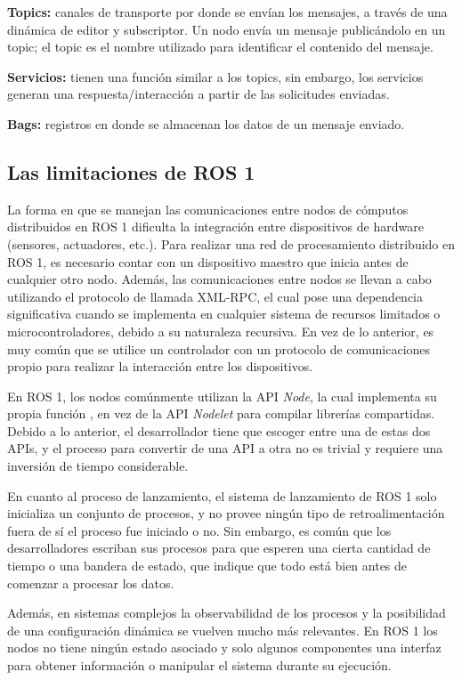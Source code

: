 \textbf{Topics:} canales de transporte por donde se envían los mensajes, a través de una dinámica de editor y subscriptor. Un nodo envía un mensaje publicándolo en un topic; el topic es el nombre utilizado para identificar el contenido del mensaje.

\textbf{Servicios:} tienen una función similar a los topics, sin embargo, los servicios generan una respuesta/interacción a partir de las solicitudes enviadas.

\textbf{Bags:} registros en donde se almacenan los datos de un mensaje enviado.

\subsection{Las limitaciones de ROS 1}

La forma en que se manejan las comunicaciones entre nodos de cómputos distribuidos en ROS 1 dificulta la integración entre dispositivos de hardware (sensores, actuadores, etc.). Para realizar una red de procesamiento distribuido en ROS 1, es necesario contar con un dispositivo maestro que inicia antes de cualquier otro nodo. Además, las comunicaciones entre nodos se llevan a cabo utilizando el protocolo de llamada XML-RPC, el cual pose una dependencia significativa cuando se implementa en cualquier sistema de recursos limitados o microcontroladores, debido a su naturaleza recursiva. En vez de lo anterior, es muy común que se utilice un controlador con un protocolo de comunicaciones propio para realizar la interacción entre los dispositivos.

En ROS 1, los nodos comúnmente utilizan la API \textit{Node}, la cual implementa su propia función , en vez de la API \textit{Nodelet} para compilar librerías compartidas. Debido a lo anterior, el desarrollador tiene que escoger entre una de estas dos APIs, y el proceso para convertir de una API a otra no es trivial y requiere una inversión de tiempo considerable.

En cuanto al proceso de lanzamiento, el sistema de lanzamiento de ROS 1 solo inicializa un conjunto de procesos, y no provee ningún tipo de retroalimentación fuera de sí el proceso fue iniciado o no. Sin embargo, es común que los desarrolladores escriban sus procesos para que esperen una cierta cantidad de tiempo o una bandera de estado, que indique que todo está bien antes de comenzar a procesar los datos. 

Además, en sistemas complejos la observabilidad de los procesos y la posibilidad de una configuración dinámica se vuelven mucho más relevantes. En ROS 1 los nodos no tiene ningún estado asociado y solo algunos componentes una interfaz para obtener información o manipular el sistema durante su ejecución.  
   
